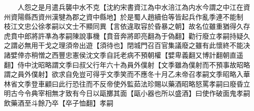 　　人怨之是月遣兵襲中水不克【沈約宋書資江為中水涪江為内水今謂之中江在資州資陽縣西資州漢犍為郡之資中縣地】於是蜀人趙續伯等皆起兵作亂季連不能制　枝江文忠公徐孝嗣以文士不顯同異【言依違取容於昏暴之朝】故名位雖重猶得久存虎賁中郎將許凖為孝嗣陳說事機【賁音奔將即亮翻為于偽翻】勸行廢立孝嗣持疑久之謂必無用干戈之理須帝出遊【須待也】閉城門召百官集議廢之雖有此懷終不能决諸嬖倖亦稍憎之西豐忠憲侯沈文季自託老病不預朝權【嬖卑義翻又博計翻朝直遥翻】侍中沈昭略謂文季曰叔父行年六十為員外僕射【文季雖為僕射而不預事故昭略謂之員外僕射】欲求自免豈可得乎文季笑而不應冬十月乙未帝召孝嗣文季昭略入華林省文季登車顧曰此行恐往而不反帝使外監茹法珍賜以藥酒昭略怒罵孝嗣曰廢昏立明古今令典宰相無才致有今日以甌擲其面【甌小器也所以盛酒】曰使作破面鬼孝嗣飲藥酒至斗餘乃卒【卒子恤翻】孝嗣